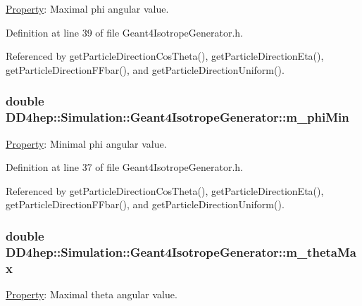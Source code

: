\hyperlink{class_d_d4hep_1_1_property}{Property}: Maximal phi angular value. 

Definition at line 39 of file Geant4IsotropeGenerator.h.

Referenced by getParticleDirectionCosTheta(), getParticleDirectionEta(), getParticleDirectionFFbar(), and getParticleDirectionUniform().\hypertarget{class_d_d4hep_1_1_simulation_1_1_geant4_isotrope_generator_a87bd2c08ac991fe265d7a88d96edec48}{
\subsubsection[{m\_\-phiMin}]{\setlength{\rightskip}{0pt plus 5cm}double {\bf DD4hep::Simulation::Geant4IsotropeGenerator::m\_\-phiMin}}}
\label{class_d_d4hep_1_1_simulation_1_1_geant4_isotrope_generator_a87bd2c08ac991fe265d7a88d96edec48}


\hyperlink{class_d_d4hep_1_1_property}{Property}: Minimal phi angular value. 

Definition at line 37 of file Geant4IsotropeGenerator.h.

Referenced by getParticleDirectionCosTheta(), getParticleDirectionEta(), getParticleDirectionFFbar(), and getParticleDirectionUniform().\hypertarget{class_d_d4hep_1_1_simulation_1_1_geant4_isotrope_generator_a0e42113b732249962b03bb340f69b0a6}{
\subsubsection[{m\_\-thetaMax}]{\setlength{\rightskip}{0pt plus 5cm}double {\bf DD4hep::Simulation::Geant4IsotropeGenerator::m\_\-thetaMax}}}
\label{class_d_d4hep_1_1_simulation_1_1_geant4_isotrope_generator_a0e42113b732249962b03bb340f69b0a6}


\hyperlink{class_d_d4hep_1_1_property}{Property}: Maximal theta angular value. 

